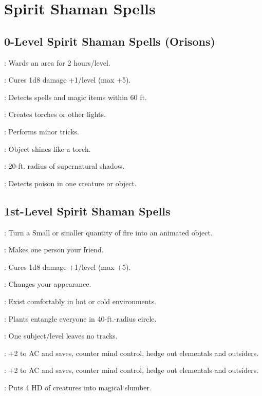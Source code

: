 \section{Spirit Shaman Spells}

\begin{multicols}{2}

\subsection{0-Level Spirit Shaman Spells (Orisons)}
\begin{description*}
\item[\linkspell{Alarm}:] Wards an area for 2 hours/level.
\item[\linkspell{Cure Minor Wounds}:] Cures 1d8 damage +1/level (max +5).
\item[\linkspell{Detect Magic}:] Detects spells and magic items within 60 ft.
\item[\linkspell{Dancing Lights}:] Creates torches or other lights.
\item[\linkspell{Prestidigitation}:] Performs minor tricks.
\item[\linkspell{Light}:] Object shines like a torch.
\item[\linkspell{Darkness}:] 20-ft. radius of supernatural shadow.
\item[\linkspell{Detect Poison}:] Detects poison in one creature or object.
\end{description*}

\subsection{1st-Level Spirit Shaman Spells}
\begin{description*}
\item[\linkspell{Animate Fire}:] Turn a Small or smaller quantity of fire into an animated object.
\item[\linkspell{Charm Person}:] Makes one person your friend.
\item[\linkspell{Cure Light Wounds}:] Cures 1d8 damage +1/level (max +5).
\item[\linkspell{Disguise Self}:] Changes your appearance.
\item[\linkspell{Endue Elements}:] Exist comfortably in hot or cold environments. 
\item[\linkspell{Entangle}:] Plants entangle everyone in 40-ft.-radius circle.
\item[\linkspell{Pass Without Trace}:] One subject/level leaves no tracks.
\item[\linkspell{Protection from Chaos}:] +2 to AC and saves, counter mind control, hedge out elementals and outsiders.
\item[\linkspell{Protection from Law}:] +2 to AC and saves, counter mind control, hedge out elementals and outsiders.
\item[\linkspell{Sleep}:] Puts 4 HD of creatures into magical slumber. 
\end{description*}


\end{multicols}
